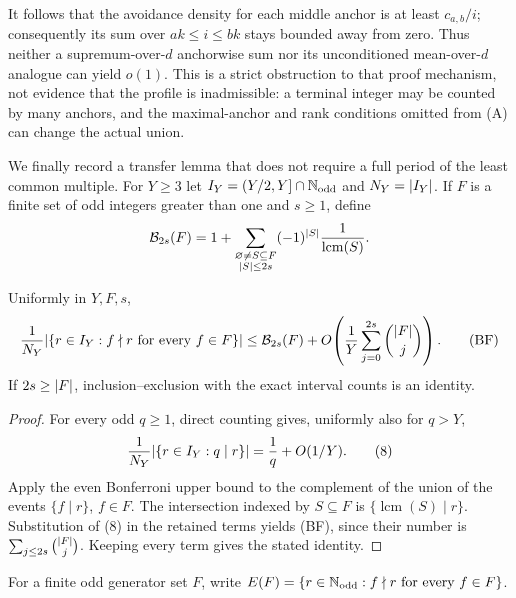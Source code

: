 It follows that the avoidance density for each middle anchor is at least
$c_{a,b}/i$; consequently its sum over $ak\leq i\leq bk$ stays bounded
away from zero.  Thus neither a supremum-over-$d$ anchorwise sum nor its
unconditioned mean-over-$d$ analogue can yield $o(1)$.  This is a strict
obstruction to that proof mechanism, not evidence that the profile is
inadmissible: a terminal integer may be counted by many anchors, and the
maximal-anchor and rank conditions omitted from (A) can change the actual
union.

We finally record a transfer lemma that does not require a full period of
the least common multiple.  For $Y\geq3$ let
$I_Y=(Y/2,Y]\cap\mathbb N_{\rm odd}$ and $N_Y=\lvert I_Y\rvert$.  If $F$ is a finite
set of odd integers greater than one and $s\geq1$, define
\[
 \mathcal B_{2s}(F)=1+
 \sum_{\substack{\varnothing\ne S\subseteq F\\\lvert S\rvert\leq2s}}
 (-1)^{\lvert S\rvert}\frac1{\operatorname{lcm}(S)}.
\]

\begin{lemma}
\label{lem:bonferroni-transfer}
Uniformly in $Y,F,s$,
\[
 \frac1{N_Y}\lvert \{r\in I_Y:f\nmid r\text{ for every }f\in F\}\rvert
 \leq \mathcal B_{2s}(F)
 +O\!\left(\frac1Y\sum_{j=0}^{2s}\binom{\lvert F\rvert}{j}\right).
 \tag{BF}
\]
If $2s\geq\lvert F\rvert$, inclusion--exclusion with the exact interval counts is
an identity.
\end{lemma}

\begin{proof}
For every odd $q\geq1$, direct counting gives, uniformly also for $q>Y$,
\[
 \frac1{N_Y}\lvert \{r\in I_Y:q\mid r\}\rvert=\frac1q+O(1/Y).
 \tag{8}
\]
Apply the even Bonferroni upper bound to the complement of the union of the
events $\{f\mid r\}$, $f\in F$.  The intersection indexed by
$S\subseteq F$ is $\{\operatorname{lcm}(S)\mid r\}$.  Substitution of
(8) in the retained terms yields (BF), since their number is
$\sum_{j\leq2s}\binom{\lvert F\rvert}{j}$.  Keeping every term gives the stated
identity.
\end{proof}

For a finite odd generator set $F$, write
$E(F)=\{r\in\mathbb N_{\rm odd}:f\nmid r\text{ for every }f\in F\}$.

